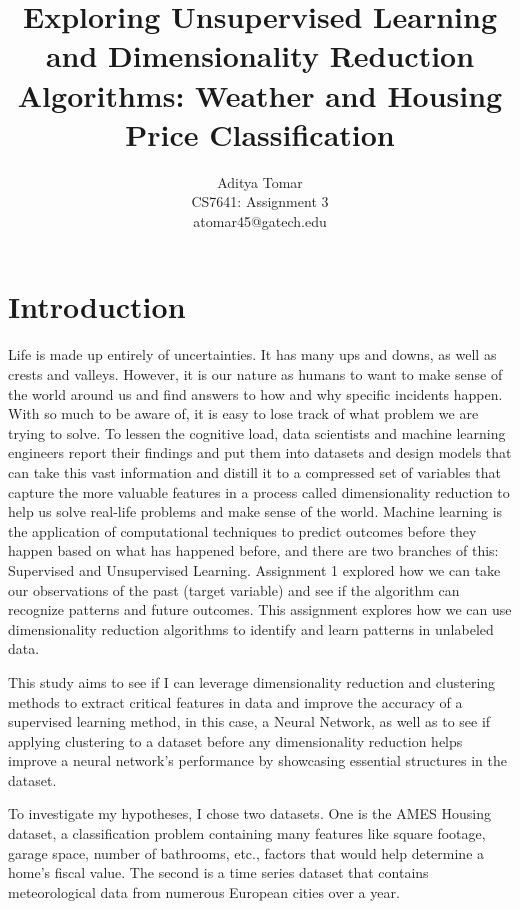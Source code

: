 \documentclass[conference]{IEEEtran}
\title{Exploring Unsupervised Learning and Dimensionality Reduction Algorithms: Weather and Housing Price Classification}
\author{Aditya Tomar \\ CS7641: Assignment 3 \\ atomar45@gatech.edu}
\begin{document}
\maketitle

\begin{abstract}

\end{abstract}

\section{Introduction} Life is made up entirely of uncertainties. It has many ups and downs, as well as crests and valleys. However, it is our nature as humans to want to make sense of the world around us and find answers to how and why specific incidents happen. With so much to be aware of, it is easy to lose track of what problem we are trying to solve. To lessen the cognitive load, data scientists and machine learning engineers report their findings and put them into datasets and design models that can take this vast information and distill it to a compressed set of variables that capture the more valuable features in a process called dimensionality reduction to help us solve real-life problems and make sense of the world. Machine learning is the application of computational techniques to predict outcomes before they happen based on what has happened before, and there are two branches of this: Supervised and Unsupervised Learning. Assignment 1 explored how we can take our observations of the past (target variable) and see if the algorithm can recognize patterns and future outcomes. This assignment explores how we can use dimensionality reduction algorithms to identify and learn patterns in unlabeled data. 
\par This study aims to see if I can leverage dimensionality reduction and clustering methods to extract critical features in data and improve the accuracy of a supervised learning method, in this case, a Neural Network, as well as to see if applying clustering to a dataset before any dimensionality reduction helps improve a neural network's performance by showcasing essential structures in the dataset.
\par To investigate my hypotheses, I chose two datasets. One is the AMES Housing dataset, a classification problem containing many features like square footage, garage space, number of bathrooms, etc., factors that would help determine a home's fiscal value. The second is a time series dataset that contains meteorological data from numerous European cities over a year. 
\end{document}
